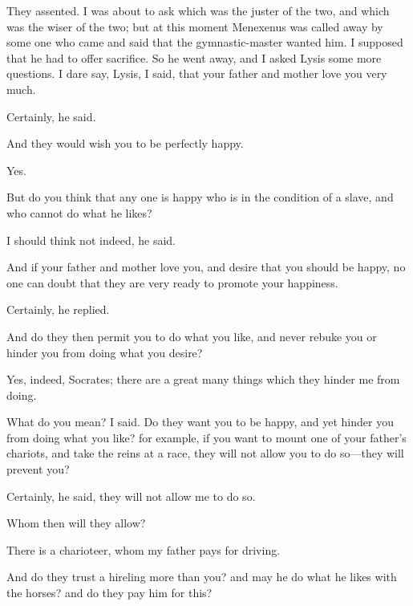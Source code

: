 \documentclass[11pt,letter]{article}
\begin{document}
\par  They assented. I was about to ask which was the juster of the two, and which was the wiser of the two; but at this moment Menexenus was called away by some one who came and said that the gymnastic-master wanted him. I supposed that he had to offer sacrifice. So he went away, and I asked Lysis some more questions. I dare say, Lysis, I said, that your father and mother love you very much.

\par  Certainly, he said.

\par  And they would wish you to be perfectly happy.

\par  Yes.

\par  But do you think that any one is happy who is in the condition of a slave, and who cannot do what he likes?

\par  I should think not indeed, he said.

\par  And if your father and mother love you, and desire that you should be happy, no one can doubt that they are very ready to promote your happiness.

\par  Certainly, he replied.

\par  And do they then permit you to do what you like, and never rebuke you or hinder you from doing what you desire?

\par  Yes, indeed, Socrates; there are a great many things which they hinder me from doing.

\par  What do you mean? I said. Do they want you to be happy, and yet hinder you from doing what you like? for example, if you want to mount one of your father's chariots, and take the reins at a race, they will not allow you to do so—they will prevent you?

\par  Certainly, he said, they will not allow me to do so.

\par  Whom then will they allow?

\par  There is a charioteer, whom my father pays for driving.

\par  And do they trust a hireling more than you? and may he do what he likes with the horses? and do they pay him for this?
\end{document}
